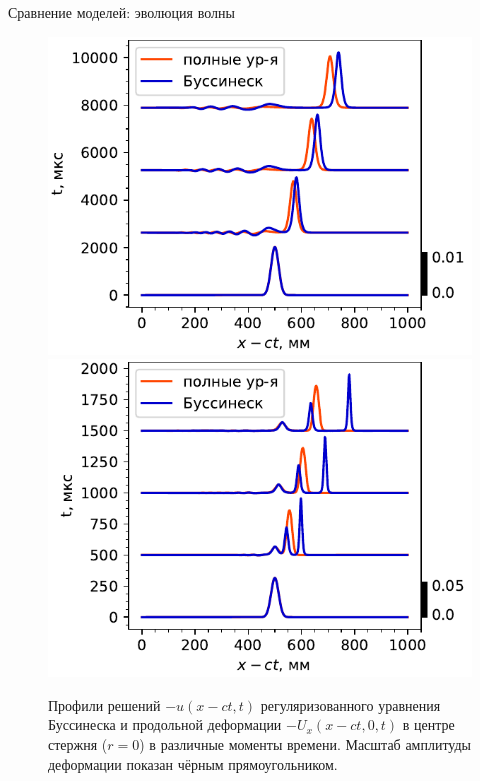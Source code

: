 \documentclass{beamer}
\begin{document}
\begin{frame}{Сравнение моделей: эволюция волны}
\begin{figure}[h]
	\centering
	\includegraphics[width=0.49\linewidth]{figures/SolEvolCompareSmallColor}
	\includegraphics[width=0.49\linewidth]{figures/SolEvolCompareSmallColor2}
	\caption{Профили решений $-u(x-ct, t)$ регуляризованного уравнения Буссинеска и продольной деформации $-U_x(x - ct, 0, t)$ в центре стержня ($r=0$) в различные моменты времени. Масштаб амплитуды деформации показан чёрным прямоугольником.}
\end{figure}
\end{frame}
\end{document}
